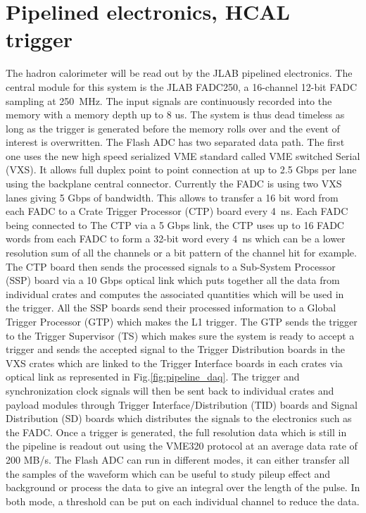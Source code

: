 \documentclass{article}
\begin{document}
\section{Pipelined electronics, HCAL trigger}
\label{sec:hcal-vxs}
The hadron calorimeter will be read out by the JLAB pipelined electronics.
The central module for this system is the JLAB FADC250, a 16-channel 12-bit FADC sampling at 250~MHz. The input signals are continuously recorded into the memory with a memory depth up to 8 us. The system is thus dead timeless as long as the trigger is generated before the memory rolls over and the event of interest is overwritten.
The Flash ADC has two separated data path.
The first one uses the new high speed serialized VME standard called VME switched Serial (VXS).
It allows full duplex point to point connection at up to 2.5 Gbps per lane using the backplane central connector.
Currently the FADC is using two VXS lanes giving 5 Gbps of bandwidth.
This allows to transfer a 16 bit word from each FADC to a Crate Trigger Processor (CTP) board every 4~ns.
Each FADC being connected to The CTP via a 5 Gbps link, the CTP uses up to 16 FADC words from each FADC to form a 32-bit word every 4~ns which can be a lower resolution sum of all the channels or a bit pattern of the channel hit for example.
The CTP board then sends the processed signals to a Sub-System Processor (SSP) board via a 10 Gbps optical link which puts together all the data from individual crates and computes the associated quantities which will be used in the trigger.
All the SSP boards send their processed information to a Global Trigger Processor (GTP) which makes the L1 trigger.
The GTP sends the trigger to the Trigger Supervisor (TS) which makes sure the system is ready to accept a trigger and sends the accepted signal to the Trigger Distribution boards in the VXS crates which are linked to the Trigger Interface boards in each crates via optical link as represented in Fig.\ref{fig:pipeline_daq}.
The trigger and synchronization clock signals will then be sent back to individual crates and payload modules through Trigger Interface/Distribution (TID) boards and Signal Distribution (SD) boards which distributes the signals to the electronics such as the FADC.
Once a trigger is generated, the full resolution data which is still in the pipeline is readout out using the VME320 protocol at an average data rate of 200 MB/s.
The Flash ADC can run in different modes, it can either transfer all the samples of the waveform which can be useful to study pileup effect and background or process the data to give an integral over the length of the pulse. In both mode, a threshold can be put on each individual channel to reduce the data.
\end{document}
